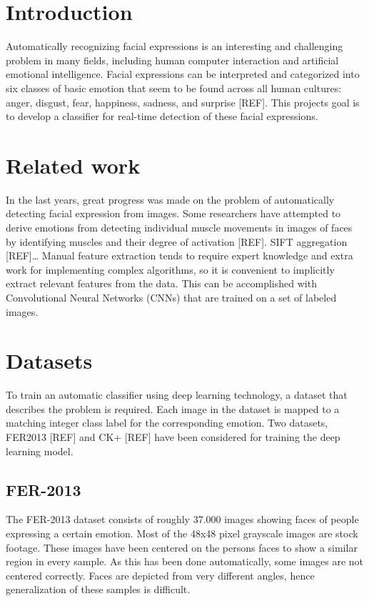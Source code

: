 \documentclass[twoside]{article}
\begin{document}
\begin{multicols}{2} %

\section{Introduction}

Automatically recognizing facial expressions is an interesting and challenging problem in many fields, including human computer interaction and artificial emotional intelligence. Facial expressions can be interpreted and categorized into six classes of basic emotion that seem to be found across all human cultures: anger, disgust, fear, happiness, sadness, and surprise [REF]. This projects goal is to develop a classifier for real-time detection of these facial expressions.


\section{Related work}
In the last years, great progress was made on the problem of automatically detecting facial expression from images. Some researchers have attempted to derive emotions from detecting individual muscle movements in images of faces by identifying muscles and their degree of activation [REF]. SIFT aggregation [REF]… Manual feature extraction tends to require expert knowledge and extra work for implementing complex algorithms, so it is convenient to implicitly extract relevant features from the data. This can be accomplished with Convolutional Neural Networks (CNNs) that are trained on a set of labeled images.


\section{Datasets}
To train an automatic classifier using deep learning technology, a dataset that describes the problem is required. Each image in the dataset is mapped to a matching integer class label for the corresponding emotion. Two datasets, FER2013 [REF] and CK+ [REF] have been considered for training the deep learning model.

\subsection{FER-2013}
The FER-2013 dataset consists of roughly 37.000 images showing faces of people expressing a certain emotion. Most of the 48x48 pixel grayscale images are stock footage. These images have been centered on the persons faces to show a similar region in every sample. As this has been done automatically, some images are not centered correctly. Faces are depicted from very different angles, hence generalization of these samples is difficult. 


\end{multicols}
\end{document}
